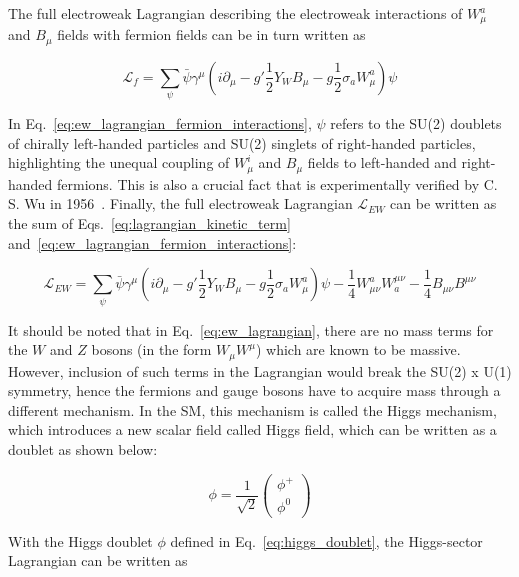 The full electroweak Lagrangian describing the electroweak interactions of $W_{\mu}^{a}$ and $B_{\mu}$ fields
with fermion fields can be in turn written as

\begin{equation}
        \mathcal{L}_{f}  = \sum_{\psi} \bar{\psi} \gamma^{\mu} \left( i \partial_{\mu} - g' \frac{1}{2} Y_{W} B_{\mu} - g \frac{1}{2} \sigma_{a} W_{\mu}^{a} \right) \psi
    \label{eq:ew_lagrangian_fermion_interactions}
\end{equation}

In Eq.~\ref{eq:ew_lagrangian_fermion_interactions}, $\psi$ refers to the SU(2) doublets of chirally left-handed particles and SU(2) singlets
of right-handed particles, highlighting the unequal coupling of $W_{\mu}^{i}$ and $B_{\mu}$ fields to left-handed and right-handed fermions.
This is also a crucial fact that is experimentally verified by C. S. Wu in 1956~\cite{Wu:1957my}. Finally, the full electroweak Lagrangian
$\mathcal{L}_{EW}$ can be written as the sum of Eqs.~\ref{eq:lagrangian_kinetic_term} and~\ref{eq:ew_lagrangian_fermion_interactions}:

\begin{equation}
    \mathcal{L}_{EW} = \sum_{\psi} \bar{\psi} \gamma^{\mu} \left( i \partial_{\mu} - g' \frac{1}{2} Y_{W} B_{\mu} - g \frac{1}{2} \sigma_{a} W_{\mu}^{a} \right) \psi - \frac{1}{4} W_{\mu\nu}^{a} W^{\mu\nu}_{a} -\frac{1}{4} B_{\mu\nu} B^{\mu\nu}
    \label{eq:ew_lagrangian}
\end{equation}

It should be noted that in Eq.~\ref{eq:ew_lagrangian}, there are no mass terms for the $W$ and $Z$ bosons (in the form $W_{\mu} W^{\mu}$)
which are known to be massive. However, inclusion of such terms in the Lagrangian would break the SU(2) x U(1) symmetry, hence the fermions
and gauge bosons have to acquire mass through a different mechanism. In the SM, this mechanism is called the Higgs mechanism, which introduces
a new scalar field called Higgs field, which can be written as a doublet as shown below:

\begin{equation}
    \phi = \frac{1}{\sqrt{2}} \begin{pmatrix}
        \phi^{+} \\ \phi^{0}
    \end{pmatrix}
    \label{eq:higgs_doublet}
\end{equation}

With the Higgs doublet $\phi$ defined in Eq.~\ref{eq:higgs_doublet}, the Higgs-sector Lagrangian can be written as

